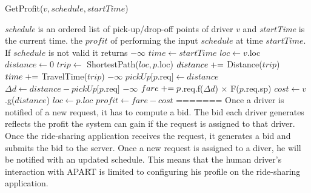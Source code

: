 \vspace{-2mm}
\begin{algorithm}
	\caption{GetProfit($v, schedule, startTime$)}
	\label{algo:get_profit}
	\begin{algorithmic}[1]
		\REQUIRE \emph{schedule} is an ordered list of pick-up/drop-off points of driver $v$ and \emph{startTime} is the current time.
		\ENSURE the $profit$ of performing the input $schedule$ at time $startTime$. If $schedule$ is not valid it returns $-\infty$
		\STATE $time \leftarrow startTime$
		\STATE $loc \leftarrow v.$loc\label{ln:loc}
		\STATE $distance \leftarrow 0$
		\STATE $trip \leftarrow$ ShortestPath($loc, p$.loc)
		\STATE $distance \mathrel{+}=$ Distance($trip$)
		\STATE $time \mathrel{+}=$ TravelTime($trip$)
		\label{ln:mwt}
		\RETURN $-\infty$
		\ENDIF
		\STATE $pickUp[p$.req$]\leftarrow distance$
		\ENDIF
		\STATE $\Delta d \leftarrow distance - pickUp[p$.req$]$
		\label{ln:mad}
		\RETURN $-\infty$
		\ENDIF
		\STATE $fare \mathrel{+}= p$.req.f($\Delta d$) $\times$ F($p$.req.sp)\label{ln:delta}
		\STATE $cost \leftarrow v$.g($distance$)\label{ln:dprof}
		\ENDIF
		\STATE $loc \leftarrow p.loc$
		\ENDFOR
		\STATE $profit \leftarrow fare - cost$
=======
Once a driver is notified of a new request, it has to compute a bid. The bid each driver generates reflects the profit the system can gain if the request is assigned to that driver. Once the ride-sharing application receives the request, it generates a bid and submits the bid to the server. Once a new request is assigned to a diver, he will be notified with an updated schedule. This means that the human driver's interaction with APART is limited to configuring his profile on the ride-sharing application.


\end{algorithmic}
\end{algorithm}
